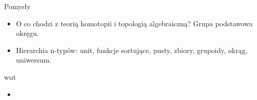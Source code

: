 \documentclass{beamer}
\begin{document}
\begin{frame}{Pomysły}
\begin{itemize}
	\item O co chodzi z teorią homotopii i topologią algebraiczną? Grupa podstawowa okręgu.
	\item Hierarchia n-typów: unit, funkcje sortujące, pusty, zbiory, grupoidy, okrąg, uniwersum.
	
\end{itemize}
\end{frame}

\begin{frame}{wut}
\begin{itemize}
	\item
\end{itemize}
\end{frame}
\end{document}

